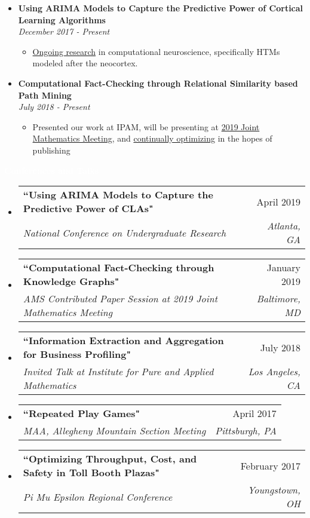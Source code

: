 \documentclass[letterpaper,11pt]{article}
\makeatletter
\newcommand{\resitem}[1]{\item #1 \vspace{-2pt}}
\newcommand{\resheading}[1]{{\large \colorbox{electricpurple}{\begin{minipage}{\textwidth}{\textbf{#1 \vphantom{p\^{E}}}}\end{minipage}}}}
\newcommand{\ressubheading}[4]{
	\begin{tabular*}{7.0in}{l@{\extracolsep{\fill}}r}
		\textbf{#1} & #2 \\
		\textit{#3} & \textit{#4} \\
	\end{tabular*}\vspace{-6pt}}
\makeatother
\begin{document}
		\begin{itemize}[topsep=3pt, itemsep=1pt]
			\item \textbf{Using ARIMA Models to Capture the Predictive Power of Cortical Learning Algorithms} \\ \textit{December 2017 - Present}
			\begin{itemize}[topsep=1pt, itemsep=1pt]
				\resitem{\href{https://github.com/alexandermichels/HonorsResearch}{Ongoing research} in computational neuroscience, specifically HTMs modeled after the neocortex.}
			\end{itemize}
			
			\item \textbf{Computational Fact-Checking through Relational Similarity based Path Mining} \\	\textit{July 2018 - Present}
			\begin{itemize}[topsep=1pt, itemsep=1pt]
				\resitem{Presented our work at IPAM, will be presenting at \href{https://jointmathematicsmeetings.org/meetings/national/jmm2019/2217_progfull.html?fbclid=IwAR0AccnUi\_yuX4UdnTVF-cCFVJ5lNYAdIvzw7TPS81eGXk1pn5PvQjaGyTo\#2217:AMSCP33}{2019 Joint Mathematics Meeting}, and \href{https://github.com/himahuja/StreamMiner}{continually optimizing} in the hopes of publishing}
			\end{itemize}
		\end{itemize}
	
		\resheading{\textcolor{white}{Conferences and Talks}}
		
		\begin{itemize}[topsep=3pt, itemsep=1pt]
			\item
			\ressubheading{``Using ARIMA Models to Capture the Predictive Power of CLAs"}{April 2019}{National Conference on Undergraduate Research}{Atlanta, GA}
			\item
			\ressubheading{``Computational Fact-Checking through Knowledge Graphs"}{January 2019}{AMS Contributed Paper Session at 2019 Joint Mathematics Meeting}{Baltimore, MD}
			\item
			\ressubheading{``Information Extraction and Aggregation for Business Profiling"}{July 2018}{Invited Talk at Institute for Pure and Applied Mathematics}{Los Angeles, CA}
			\item
			\ressubheading{``Repeated Play Games"}{April 2017}{MAA, Allegheny Mountain Section Meeting}{Pittsburgh, PA}
			\item
			\ressubheading{``Optimizing Throughput, Cost, and Safety in Toll Booth Plazas"}{February 2017}{Pi Mu Epsilon Regional Conference}{Youngstown, OH}
			
		\end{itemize}
	\pagebreak
	
\end{document}
